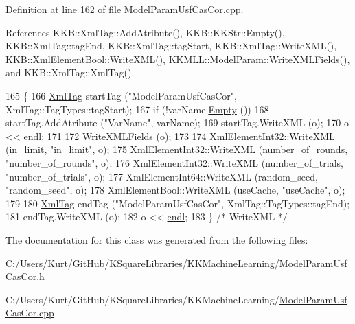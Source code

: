 Definition at line 162 of file Model\+Param\+Usf\+Cas\+Cor.\+cpp.



References K\+K\+B\+::\+Xml\+Tag\+::\+Add\+Atribute(), K\+K\+B\+::\+K\+K\+Str\+::\+Empty(), K\+K\+B\+::\+Xml\+Tag\+::tag\+End, K\+K\+B\+::\+Xml\+Tag\+::tag\+Start, K\+K\+B\+::\+Xml\+Tag\+::\+Write\+X\+M\+L(), K\+K\+B\+::\+Xml\+Element\+Bool\+::\+Write\+X\+M\+L(), K\+K\+M\+L\+L\+::\+Model\+Param\+::\+Write\+X\+M\+L\+Fields(), and K\+K\+B\+::\+Xml\+Tag\+::\+Xml\+Tag().


\begin{DoxyCode}
165 \{
166   \hyperlink{class_k_k_b_1_1_xml_tag}{XmlTag}  startTag (\textcolor{stringliteral}{"ModelParamUsfCasCor"},  XmlTag::TagTypes::tagStart);
167   \textcolor{keywordflow}{if}  (!varName.\hyperlink{class_k_k_b_1_1_k_k_str_ac69942f73fffd672ec2a6e1c410afdb6}{Empty} ())
168     startTag.AddAtribute (\textcolor{stringliteral}{"VarName"}, varName);
169   startTag.WriteXML (o);
170   o << \hyperlink{namespace_k_k_b_ad1f50f65af6adc8fa9e6f62d007818a8}{endl};
171 
172   \hyperlink{class_k_k_m_l_l_1_1_model_param_a91dc06ec604cf9c2a045991e9b88b5d3}{WriteXMLFields} (o);
173 
174   XmlElementInt32::WriteXML (in\_limit,          \textcolor{stringliteral}{"in\_limit"},         o);
175   XmlElementInt32::WriteXML (number\_of\_rounds,  \textcolor{stringliteral}{"number\_of\_rounds"}, o);
176   XmlElementInt32::WriteXML (number\_of\_trials,  \textcolor{stringliteral}{"number\_of\_trials"}, o);
177   XmlElementInt64::WriteXML (random\_seed,       \textcolor{stringliteral}{"random\_seed"},      o);
178   XmlElementBool::WriteXML  (useCache,          \textcolor{stringliteral}{"useCache"},         o);
179   
180   \hyperlink{class_k_k_b_1_1_xml_tag}{XmlTag}  endTag (\textcolor{stringliteral}{"ModelParamUsfCasCor"}, XmlTag::TagTypes::tagEnd);
181   endTag.WriteXML (o);
182   o << \hyperlink{namespace_k_k_b_ad1f50f65af6adc8fa9e6f62d007818a8}{endl};
183 \}  \textcolor{comment}{/* WriteXML */}
\end{DoxyCode}


The documentation for this class was generated from the following files\+:\begin{DoxyCompactItemize}
\item 
C\+:/\+Users/\+Kurt/\+Git\+Hub/\+K\+Square\+Libraries/\+K\+K\+Machine\+Learning/\hyperlink{_model_param_usf_cas_cor_8h}{Model\+Param\+Usf\+Cas\+Cor.\+h}\item 
C\+:/\+Users/\+Kurt/\+Git\+Hub/\+K\+Square\+Libraries/\+K\+K\+Machine\+Learning/\hyperlink{_model_param_usf_cas_cor_8cpp}{Model\+Param\+Usf\+Cas\+Cor.\+cpp}\end{DoxyCompactItemize}
